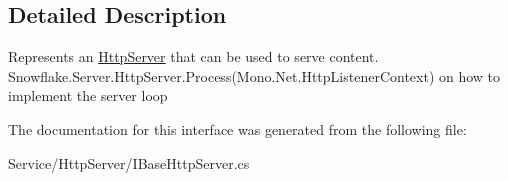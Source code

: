 \subsection{Detailed Description}
Represents an \hyperlink{namespace_snowflake_1_1_service_1_1_http_server}{Http\+Server} that can be used to serve content. Snowflake.\+Server.\+Http\+Server.\+Process(\+Mono.\+Net.\+Http\+Listener\+Context) on how to implement the server loop 



The documentation for this interface was generated from the following file\+:\begin{DoxyCompactItemize}
\item 
Service/\+Http\+Server/I\+Base\+Http\+Server.\+cs\end{DoxyCompactItemize}
